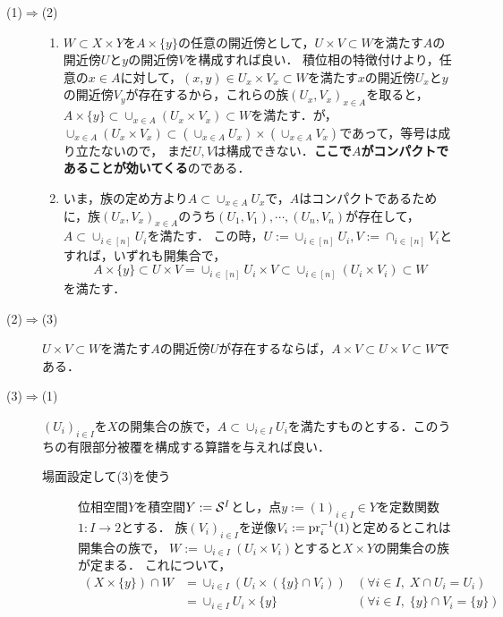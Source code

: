 \documentclass[uplatex,dvipdfmx]{jsreport}
\begin{document}
\begin{Proof}\mbox{}
    \begin{description}
        \item[(1)$\Rightarrow$(2)] 
        \begin{enumerate}
        \item 
        $W\subset X\times Y$を$A\times\{y\}$の任意の開近傍として，$U\times V\subset W$を満たす$A$の開近傍$U$と$y$の開近傍$V$を構成すれば良い．
        積位相の特徴付けより，任意の$x\in A$に対して，$(x,y)\in U_x\times V_x\subset W$を満たす$x$の開近傍$U_x$と$y$の開近傍$V_y$が存在するから，これらの族$(U_x,V_x)_{x\in A}$を取ると，
        $A\times\{y\}\subset\cup_{x\in A}(U_x\times V_x)\subset W$を満たす．が，$\cup_{x\in A}(U_x\times V_x)\subset (\cup_{x\in A}U_x)\times(\cup_{x\in A}V_x)$であって，等号は成り立たないので，
        まだ$U,V$は構成できない．\textbf{ここで$A$がコンパクトであることが効いてくる}のである．
        \item
        いま，族の定め方より$A\subset\cup_{x\in A}U_x$で，$A$はコンパクトであるために，族$(U_x,V_x)_{x\in A}$のうち$(U_1,V_1),\cdots,(U_n,V_n)$が存在して，$A\subset\cup_{i\in[n]}U_i$を満たす．
        この時，$U:=\cup_{i\in[n]}U_i,V:=\cap_{i\in[n]}V_i$とすれば，いずれも開集合で，
        \[A\times\{y\}\subset U\times V=\cup_{i\in[n]}U_i\times V\subset\cup_{i\in[n]}(U_i\times V_i)\subset W\]
        を満たす．
        \end{enumerate}
        \item[(2)$\Rightarrow$(3)]
        $U\times V\subset W$を満たす$A$の開近傍$U$が存在するならば，$A\times V\subset U\times V\subset W$である．
        \item[(3)$\Rightarrow$(1)] $(U_i)_{i\in I}$を$X$の開集合の族で，$A\subset\cup_{i\in I}U_i$を満たすものとする．このうちの有限部分被覆を構成する算譜を与えれば良い．
        \begin{description}
            \item[場面設定して(3)を使う] 
            位相空間$Y$を積空間$Y:=\S^I$とし，点$y:=(1)_{i\in I}\in Y$を定数関数$1:I\to 2$とする．
            族$(V_i)_{i\in I}$を逆像$V_i:=\pr_i^{-1}(1)$と定めるとこれは開集合の族で，
            $W:=\cup_{i\in I}(U_i\times V_i)$とすると$X\times Y$の開集合の族が定まる．
            これについて，
            \begin{align*}
                (X\times\{y\})\cap W&=\cup_{i\in I}(U_i\times(\{y\}\cap V_i))&(\forall i\in I,\;X\cap U_i=U_i)\\
                &=\cup_{i\in I}U_i\times\{y\}&(\forall i\in I,\;\{y\}\cap V_i=\{y\})

\end{align*}
\end{description}
\end{description}
\end{Proof}
\end{document}

